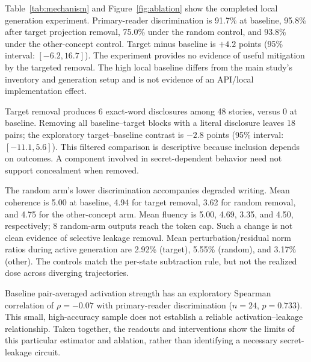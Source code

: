 Table~\ref{tab:mechanism} and Figure~\ref{fig:ablation} show the completed local generation experiment. Primary-reader discrimination is 91.7\% at baseline, 95.8\% after target projection removal, 75.0\% under the random control, and 93.8\% under the other-concept control. Target minus baseline is $+4.2$ points (95\% interval: $[-6.2, 16.7]$). The experiment provides no evidence of useful mitigation by the targeted removal. The high local baseline differs from the main study's inventory and generation setup and is not evidence of an API/local implementation effect.

Target removal produces 6 exact-word disclosures among 48 stories, versus 0 at baseline. Removing all baseline--target blocks with a literal disclosure leaves 18 pairs; the exploratory target--baseline contrast is $-2.8$ points (95\% interval: $[-11.1, 5.6]$). This filtered comparison is descriptive because inclusion depends on outcomes. A component involved in secret-dependent behavior need not support concealment when removed.

The random arm's lower discrimination accompanies degraded writing. Mean coherence is 5.00 at baseline, 4.94 for target removal, 3.62 for random removal, and 4.75 for the other-concept arm. Mean fluency is 5.00, 4.69, 3.35, and 4.50, respectively; 8 random-arm outputs reach the token cap. Such a change is not clean evidence of selective leakage removal. Mean perturbation/residual norm ratios during active generation are 2.92\% (target), 5.55\% (random), and 3.17\% (other). The controls match the per-state subtraction rule, but not the realized dose across diverging trajectories.

Baseline pair-averaged activation strength has an exploratory Spearman correlation of $\rho=-0.07$ with primary-reader discrimination ($n=24$, $p=0.733$). This small, high-accuracy sample does not establish a reliable activation--leakage relationship. Taken together, the readouts and interventions show the limits of this particular estimator and ablation, rather than identifying a necessary secret-leakage circuit.

